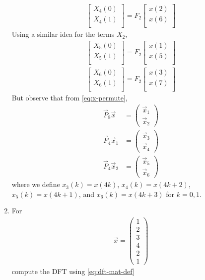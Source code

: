 \documentclass[journal,12pt,twocolumn]{IEEEtran}
\newcommand{\myvec}[1]{\ensuremath{\begin{pmatrix}#1\end{pmatrix}}}
\renewcommand\thesection{\arabic{section}}
\begin{document}
\begin{enumerate}[label=\thesection.\arabic*]
\begin{align}
\begin{bmatrix}
X_{4}(0) \\ 
X_{4}(1)\\ 
\end{bmatrix}
= F_{2}
\begin{bmatrix}
x(2) \\ 
x(6) \\ 
\end{bmatrix}
\end{align}
Using a similar idea for the terms $X_2$, 
\begin{align}
\begin{bmatrix}
X_{5}(0) \\ 
X_{5}(1)\\ 
\end{bmatrix}
= F_{2}
\begin{bmatrix}
x(1) \\ 
x(5) \\ 
\end{bmatrix} \\
\begin{bmatrix}
X_{6}(0) \\ 
X_{6}(1)\\ 
\end{bmatrix}
= F_{2}
\begin{bmatrix}
x(3) \\ 
x(7) \\ 
\end{bmatrix}
\end{align}
But observe that from \eqref{eq:x-permute},
\begin{align}
	\vec{P}_8\vec{x} &= \myvec{\vec{x}_1\\\vec{x}_2} \\
	\vec{P}_4\vec{x}_1 &= \myvec{\vec{x}_3\\\vec{x}_4} \\ 
	\vec{P}_4\vec{x}_2 &= \myvec{\vec{x}_5\\\vec{x}_6}
\end{align}
where we define $x_3(k) = x(4k)$, $x_4(k) = x(4k + 2)$, $x_5(k) = x(4k + 1)$, and $x_6(k) = x(4k + 3)$ for $k = 0, 1$.
\item For 
    \begin{align}
	    \vec{x} = \myvec{1\\2\\3\\4\\2\\1}
        \label{eq:equation1}
    \end{align}
    compute the DFT  
		using 
	    \eqref{eq:dft-mat-def}

\end{enumerate}
\end{document}
